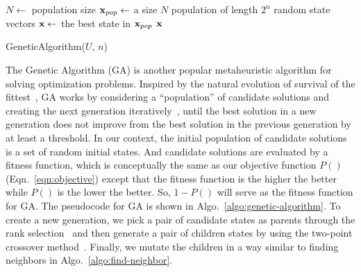 \begin{algorithm}[ht]
        $N \leftarrow$ population size\;
	$\mathbf{x}_{pop} \leftarrow$ a size $N$ population of length $2^{n}$ random state vectors\;
        $\mathbf{x} \leftarrow$ the best state in $\mathbf{x}_{pop}$   \;
	\Return $\mathbf{x}$ \;
	\caption{GeneticAlgorithm($U$, $n$)}
\label{algo:genetic-algorithm}
\end{algorithm}

The Genetic Algorithm (GA) is another popular metaheuristic algorithm for solving optimization problems.
Inspired by the natural evolution of survival of the fittest~\cite{Holland_1992}, 
GA works by considering a ``population'' of candidate solutions and creating the
next generation iteratively~\cite{caitao2016}, until the best solution in a new generation does not
improve from the best solution in the previous generation by at least a threshold.
In our context, the initial population of candidate solutions is a set of random initial states. 
And candidate solutions are evaluated by a fitness function, which is conceptually the same as our 
objective function $P()$ (Eqn.~\ref{eqn:objective}) except that the fitness function is 
the higher the better while $P()$ is the lower the better.
So, $1-P()$ will serve as the fitness function for GA.
The pseudocode for GA is shown in Algo.~\ref{algo:genetic-algorithm}.
To create a new generation, we pick a pair of candidate states as parents through the 
rank selection~\cite{review-ga} and then generate a pair of children states by using the two-point 
crossover method~\cite{review-ga}. 
Finally, we mutate the children in a way similar to finding neighbors in Algo.~\ref{algo:find-neighbor}.

